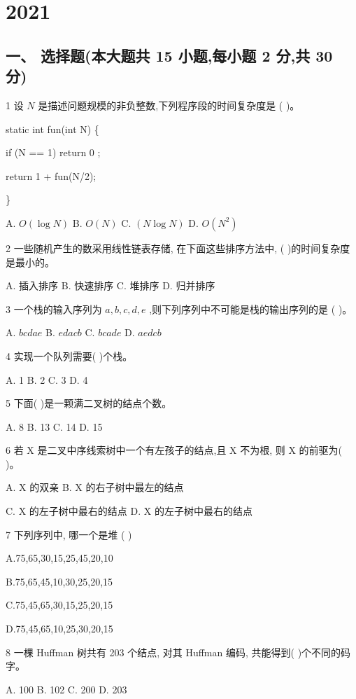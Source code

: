 \chapter{2021}
\section*{一、 选择题(本大题共 15 小题,每小题 2 分,共 30 分)}

1 设 \(N\) 是描述问题规模的非负整数,下列程序段的时间复杂度是 (   )。

static int fun(int N) \{

if (N == 1) return 0 ;

return 1 + fun(N/2);

\}

A. \(O\left( {\log N}\right)\) B. \(O\left( N\right)\) C. \(\left( {N\log N}\right)\) D. \(O\left( {N}^{2}\right)\)

2 一些随机产生的数采用线性链表存储, 在下面这些排序方法中, (   )的时间复杂度是最小的。

A. 插入排序 B. 快速排序 C. 堆排序 D. 归并排序

3 一个栈的输入序列为 \(a,b,c,d,e\) ,则下列序列中不可能是栈的输出序列的是 (   )。

A. \({b c d a e}\) B. \({e d a c b}\) C. \({b c a d e}\) D. \({a e d c b}\)

4 实现一个队列需要(   )个栈。

A. 1 B. 2 C. 3 D. 4

5 下面(   )是一颗满二叉树的结点个数。

A. 8 B. 13 C. 14 D. 15

6 若 \(\mathrm{X}\) 是二叉中序线索树中一个有左孩子的结点,且 \(\mathrm{X}\) 不为根, 则 \(\mathrm{X}\) 的前驱为(   )。

A. \(\mathrm{X}\) 的双亲 \hspace{2em} B. X 的右子树中最左的结点

C. \(\mathrm{X}\) 的左子树中最右的结点 D. \(\mathrm{X}\) 的左子树中最右的结点

7 下列序列中, 哪一个是堆 (   )

A.75,65,30,15,25,45,20,10

B.75,65,45,10,30,25,20,15

C.75,45,65,30,15,25,20,15

D.75,45,65,10,25,30,20,15

8 一棵 Huffman 树共有 203 个结点, 对其 Huffman 编码, 共能得到(   )个不同的码字。

A. 100 B. 102 C. 200 D. 203


